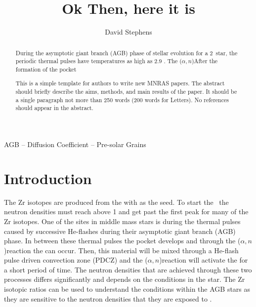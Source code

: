 \documentclass[fleqn,usenatbib]{mnras}
\title[Short title, max. 45 characters]{Ok Then, here it is}
\author[D. Stephens]{
David Stephens}
\begin{document}
\label{firstpage}
\pagerange{\pageref{firstpage}--\pageref{lastpage}}
\maketitle

\begin{abstract}
During the asymptotic giant branch (AGB) phase of stellar evolution for a 2\Msun~star, the periodic thermal pulses have temperatures as high as 2.9 \K. The \neon[22]($\alpha,n$)\magnesium[25]
After the formation of the \carbon[13] pocket 

This is a simple template for authors to write new MNRAS papers.
The abstract should briefly describe the aims, methods, and main results of the paper.
It should be a single paragraph not more than 250 words (200 words for Letters).
No references should appear in the abstract.
\end{abstract}

\begin{keywords}
AGB -- Diffusion Coefficient -- Pre-solar Grains
\end{keywords}



\section{Introduction}

The Zr isotopes are produced from the \spr with \iron[56] as the seed. To start the \spr~the neutron densities must reach above 1   and get past the first peak for many of the Zr isotopes. One of the \spr sites in middle mass stars is during the thermal pulses caused by successive He-flashes during their asymptotic giant branch (AGB) phase. In between these thermal pulses the \carbon[13] pocket develops and through the \carbon[13]($\alpha,n$)\oxygen[16] reaction the \spr can occur. Then, this material will be mixed through a He-flash pulse driven convection zone (PDCZ) and the \neon[22]($\alpha,n$)\magnesium[25] reaction will activate the \spr for a short period of time. The neutron densities that are achieved through these two processes differs significantly and depends on the conditions in the star. The Zr isotopic ratios can be used to understand the conditions within the AGB stars as they are sensitive to the neutron densities that they are exposed to \citep{zr}.
\end{document}
